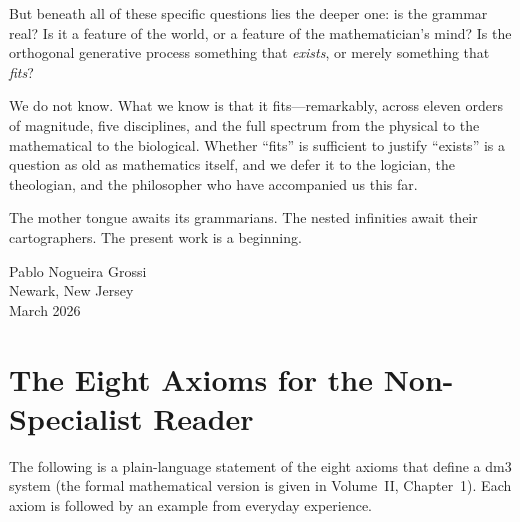 \documentclass[12pt, oneside]{book}
\theoremstyle{plain}
\theoremstyle{definition}
\theoremstyle{remark}
\begin{document}
But beneath all of these specific questions lies the deeper
one: is the grammar real? Is it a feature of the world, or
a feature of the mathematician's mind? Is the orthogonal
generative process something that \emph{exists}, or merely
something that \emph{fits}?

We do not know. What we know is that it fits---remarkably,
across eleven orders of magnitude, five disciplines, and
the full spectrum from the physical to the mathematical to
the biological. Whether ``fits'' is sufficient to justify
``exists'' is a question as old as mathematics itself, and
we defer it to the logician, the theologian, and the philosopher
who have accompanied us this far.

The mother tongue awaits its grammarians. The nested infinities
await their cartographers. The present work is a beginning.

\bigskip
\begin{flushright}
Pablo Nogueira Grossi\\
Newark, New Jersey\\
March 2026
\end{flushright}

\appendix
\chapter{The Eight Axioms for the Non-Specialist Reader}
\label{app:axioms}

The following is a plain-language statement of the eight axioms
that define a dm3 system (the formal mathematical version is
given in Volume~II, Chapter~1). Each axiom is followed by an
example from everyday experience.
\end{document}
